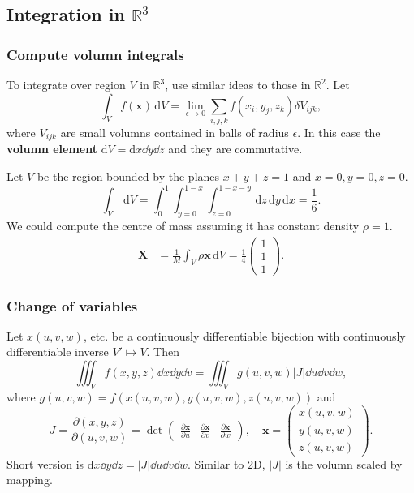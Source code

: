 \subsection{Integration in $ \mathbb{R}^{3} $}
\subsubsection*{Compute volumn integrals}

To integrate over region $V$ in $ \mathbb{R}^{3}$, use similar ideas to those in $ \mathbb{R}^{2} $. Let 
\[
    \int_{V} f(\mathbf{x}) \,\mathrm{d}V = \lim_{\epsilon \to 0} \sum_{i,j,k} f(x_i,y_j,z_k)\delta V_{ijk},
\]
where $ V_{ijk} $ are small volumns contained in balls of radius $\epsilon$. In this case the \textbf{volumn element} $ \mathrm{d} V = \mathrm{d} x\dd y\dd z $ and they are commutative.

\begin{example}
    Let $V$ be the region bounded by the planes $ x+y+z=1 $ and $ x=0,y=0,z=0 $.
    \[
        \int_{V} \,\mathrm{d}V = \int_{0}^{1} \int_{y=0}^{1-x} \int_{z=0}^{1-x-y}  \,\mathrm{d}z \,\mathrm{d}y \,\mathrm{d}x
        = \frac{1}{6}.
    \]
    We could compute the centre of mass assuming it has constant density $ \rho=1 $. 
    \begin{align*}
        \mathbf{X} &= \frac{1}{M} \int_{V} \rho\mathbf{x} \,\mathrm{d}V = \frac{1}{4}\begin{pmatrix}
            1 \\ 1 \\ 1
        \end{pmatrix}.
    \end{align*}
\end{example}

\subsubsection*{Change of variables}
\begin{proposition}
    Let $ x(u,v,w) $, etc. be a continuously differentiable bijection with continuously differentiable inverse $ V'\mapsto V $. Then 
    \[
        \iiint_{V} f(x,y,z)\dd x\dd y\dd v = \iiint_{V} g(u,v,w)|J|\dd u\dd v\dd w,
    \]
    where $ g(u,v,w)= f(x(u,v,w),y(u,v,w),z(u,v,w))$ and
    \[
        J = \frac{\partial (x,y,z)}{\partial (u,v,w)} = \det \left(\!\!\! \begin{array}{c|c|c}
           \displaystyle \frac{\partial \mathbf{x}}{\partial u}\!\!\!&\!\!\displaystyle\frac{\partial \mathbf{x}}{\partial v}\!\!\!&\!\!\displaystyle\frac{\partial\mathbf{x}}{\partial w}
        \end{array}\!\!\! \right),\quad \mathbf{x} = \begin{pmatrix}
            x(u,v,w) \\ y(u,v,w) \\ z(u,v,w)
        \end{pmatrix}.
    \]
    Short version is $ \mathrm{d} x\dd y\dd z = |J|\dd u\dd v\dd w $. Similar to 2D, $|J|$ is the volumn scaled by mapping.
\end{proposition}

